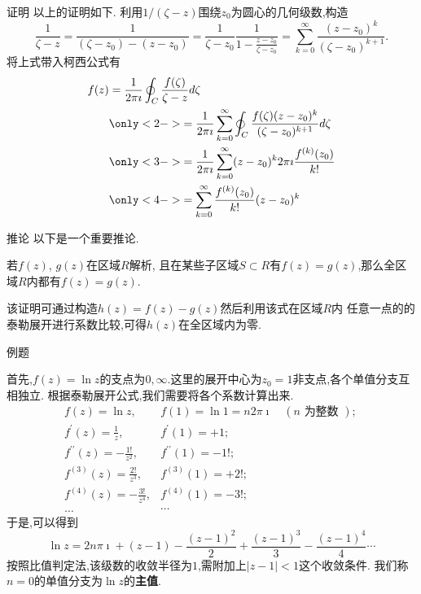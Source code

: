 \documentclass[fontset=windows, chinese, 10pt]{beamer}
\begin{document}
\begin{frame}{证明}
  \small
  以上的证明如下.
  利用$1/(\zeta -z)$围绕$z_0$为圆心的几何级数,构造
\[
\frac{1}{\zeta -z} = \frac{1}{(\zeta -z_0) - (z - z_0)} = \frac{1}{\zeta - z_0}\frac{1}{ 1 - \frac{z-z_0}{\zeta - z_0}}
 = \sum_{k=0}^{\infty}\frac{(z-z_0)^k}{(\zeta - z_0)^{k+1}}.    
\]
将上式带入柯西公式有
\begin{equation}
    \begin{aligned}
        f(z) & = \frac{1}{2\pi \imath} \oint_C \frac{f(\zeta)}{\zeta - z} d \zeta \\
        & \only<2->{= \frac{1}{2\pi \imath} \sum_{k=0} ^{\infty} \oint_C \frac{f(\zeta)(z-z_0)^k}{(\zeta - z_0)^{k+1}} d \zeta} \\
        & \only<3->{= \frac{1}{2\pi \imath} \sum_{k=0} ^{\infty}(z-z_0)^k 2\pi \imath \frac{f^{(k)}(z_0)}{k!}} \\
        & \only<4->{= \sum_{k=0} ^{\infty}  \frac{f^{(k)}(z_0)}{k!} (z-z_0)^k}
    \end{aligned}
\end{equation}
\end{frame}

\begin{frame}{推论}
  \small
以下是一个重要推论.

若$f(z)$, $g(z)$在区域$R$解析,
且在某些子区域$S\subset R$有$f(z)=g(z)$,那么全区域$R$内都有$f(z)=g(z)$.

该证明可通过构造$h(z) = f(z) - g(z)$然后利用该式在区域$R$内
任意一点的的泰勒展开进行系数比较,可得$h(z)$在全区域内为零.
%
\end{frame}

\begin{frame}{例题}
  \small
  {
\begin{solution}
    首先,$f(z) = \ln z $的支点为$0,\infty$.这里的展开中心为$z_0=1$非支点,各个单值分支互相独立.
    根据泰勒展开公式,我们需要将各个系数计算出来.
    \[
        \begin{array}{ll}
            f(z)=\ln z, & f(1)=\ln 1=n 2 \pi \imath \quad(n \text { 为整数 }) \text {; } \\
            f^{\prime}(z)=\frac{1}{z}, & f^{\prime}(1)=+1 ; \\
            f^{\prime \prime}(z)=-\frac{1 !}{z^2}, & f^{\prime \prime}(1)=-1 ! ; \\
            f^{(3)}(z)=\frac{2 !}{z^3}, & f^{(3)}(1)=+2 ! ; \\
            f^{(4)}(z)=-\frac{3 !}{z^4}, & f^{(4)}(1)=-3 ! ; \\
            \ldots & \cdots
            \end{array}
    \]
    于是,可以得到
    \[
    \ln z = 2 n \pi \imath + (z-1) - \frac{(z-1)^2}{2} +  \frac{(z-1)^3}{3} -  \frac{(z-1)^4}{4} \cdots
    \]
    按照比值判定法,该级数的收敛半径为$1$,需附加上$|z-1|< 1$这个收敛条件.
    我们称$n=0$的单值分支为$\ln z $的\textbf{主值}.
\end{solution}
}
\end{frame}
\end{document}
